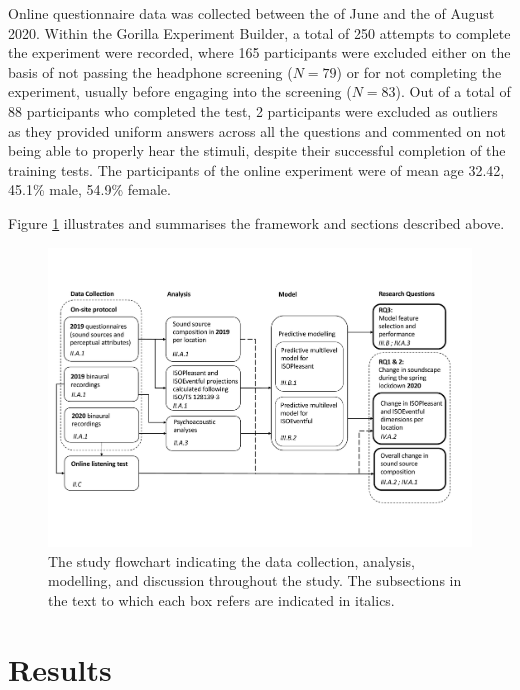    Online questionnaire data was collected between the  of June and the  of August 2020. Within the Gorilla Experiment Builder, a total of 250 attempts to complete the experiment were recorded, where 165 participants were excluded either on the basis of not passing the headphone screening ($N=79$) or for not completing the experiment, usually before engaging into the screening ($N=83$). Out of a total of 88 participants who completed the test, 2 participants were excluded as outliers as they provided uniform answers across all the questions and commented on not being able to properly hear the stimuli, despite their successful completion of the training tests. The participants of the online experiment were of mean age 32.42, 45.1\% male, 54.9\% female.

   Figure \ref{fig:lockdown-study-framework} illustrates and summarises the framework and sections described above.

   \begin{figure}
     \label{fig:lockdown-study-framework}
     \centering
     \includegraphics[width=\textwidth]{Figures/Lockdown-Fig1.pdf}
     \caption{The study flowchart indicating the data collection, analysis, modelling, and discussion throughout the study. The subsections in the text to which each box refers are indicated in italics.}
   \end{figure}

\section{Results}

